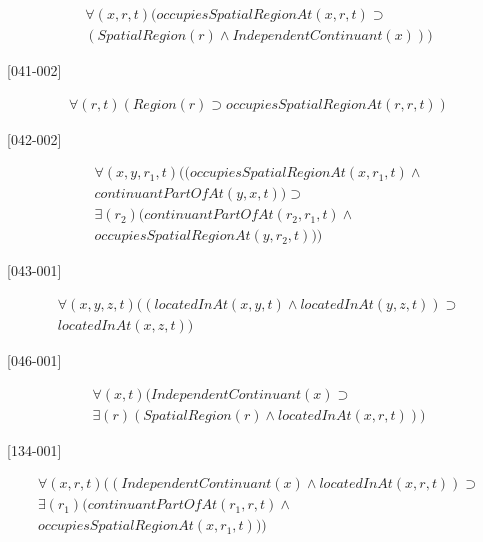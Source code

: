 \documentclass{article}
\begin{document}
\begin{flushright}
[040-001] 

\begin{equation}
\begin{split}
{\forall}(x, r, t)(occupiesSpatialRegionAt(x, r, t) \supset \\
(SpatialRegion(r) \wedge IndependentContinuant(x)))
\end{split}
\end{equation}

[041-002] 

\begin{equation}
\begin{split}
{\forall}(r, t)(Region(r) \supset occupiesSpatialRegionAt(r, r, t))
\end{split}
\end{equation}

[042-002] 

\begin{equation}
\begin{split}
{\forall}(x, y, r_1, t)((occupiesSpatialRegionAt(x, r_1, t) \wedge \\
continuantPartOfAt(y, x, t)) \supset \\
{\exists}(r_2)(continuantPartOfAt(r_2, r_1, t) \wedge \\
occupiesSpatialRegionAt(y, r_2, t)))
\end{split}
\end{equation}

[043-001] 

\begin{equation}
\begin{split}
{\forall}(x, y, z, t)((locatedInAt(x, y, t) \wedge locatedInAt(y, z, t)) \supset \\
locatedInAt(x, z, t))
\end{split}
\end{equation}

[046-001] 

\begin{equation}
\begin{split}
{\forall}(x, t)(IndependentContinuant(x) \supset \\
{\exists}(r)(SpatialRegion(r) \wedge locatedInAt(x, r, t)))
\end{split}
\end{equation}

[134-001] 

\begin{equation}
\begin{split}
{\forall}(x, r, t)((IndependentContinuant(x) \wedge locatedInAt(x, r, t)) \supset \\
{\exists}(r_1)(continuantPartOfAt(r_1, r, t) \wedge \\
occupiesSpatialRegionAt(x, r_1, t)))
\end{split}
\end{equation}


\end{flushright}
\end{document}
